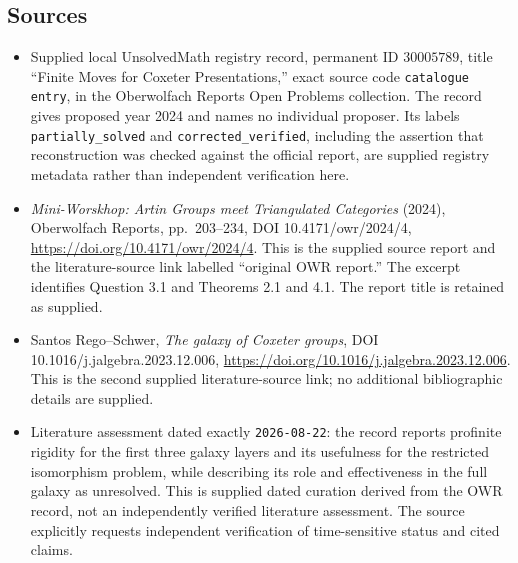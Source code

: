 \documentclass[11pt]{article}
\begin{document}
\subsection{Sources}
\begin{itemize}
\item Supplied local UnsolvedMath registry record, permanent ID \(30005789\), title ``Finite Moves for Coxeter Presentations,'' exact source code \texttt{catalogue entry}, in the Oberwolfach Reports Open Problems collection. The record gives proposed year 2024 and names no individual proposer. Its labels \texttt{partially\_solved} and \texttt{corrected\_verified}, including the assertion that reconstruction was checked against the official report, are supplied registry metadata rather than independent verification here.
\item \emph{Mini-Worskhop: Artin Groups meet Triangulated Categories} (2024), Oberwolfach Reports, pp.\ 203--234, DOI 10.4171/owr/2024/4, \url{https://doi.org/10.4171/owr/2024/4}. This is the supplied source report and the literature-source link labelled ``original OWR report.'' The excerpt identifies Question 3.1 and Theorems 2.1 and 4.1. The report title is retained as supplied.
\item Santos Rego--Schwer, \emph{The galaxy of Coxeter groups}, DOI 10.1016/j.jalgebra.2023.12.006, \url{https://doi.org/10.1016/j.jalgebra.2023.12.006}. This is the second supplied literature-source link; no additional bibliographic details are supplied.
\item Literature assessment dated exactly \texttt{2026-08-22}: the record reports profinite rigidity for the first three galaxy layers and its usefulness for the restricted isomorphism problem, while describing its role and effectiveness in the full galaxy as unresolved. This is supplied dated curation derived from the OWR record, not an independently verified literature assessment. The source explicitly requests independent verification of time-sensitive status and cited claims.
\end{itemize}
\end{document}
